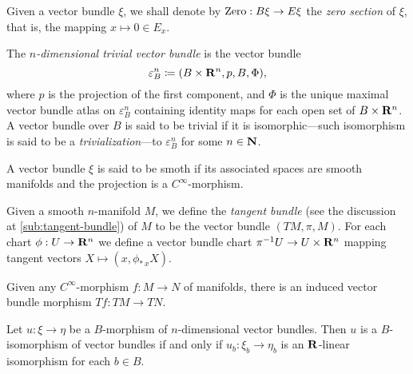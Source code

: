 \documentclass[../../../deep-dive]{subfile}
\begin{document}
\begin{definition}
\label{def:zero-section}
Given a vector bundle \(\xi\), we shall denote by \(\operatorname{Zero}: B \xi \to E \xi\)
the \emph{zero section} of \(\xi\), that is, the mapping \(x \mapsto 0 \in E_x\).
\end{definition}

\begin{definition}
\label{def:trivial-vector-bundle}
The \emph{\(n\)-dimensional trivial vector bundle} is the vector bundle
\[
\varepsilon_B^n \coloneq (B \times \mathbf{R}^n, p, B, \Phi),
\]
where \(p\) is the projection of the first component, and \(\Phi\) is the unique
maximal vector bundle atlas on \(\varepsilon_B^n\) containing identity maps for
each open set of \(B \times \mathbf{R}^n\). A vector bundle over \(B\) is said to be
trivial if it is isomorphic---such isomorphism is said to be a
\emph{trivialization}---to \(\varepsilon_B^n\) for some \(n \in \mathbf{N}\).
\end{definition}

\begin{definition}
\label{def:smooth-bundles}
A vector bundle \(\xi\) is said to be smoth if its associated spaces are smooth
manifolds and the projection is a \(C^{\infty}\)-morphism.
\end{definition}

\begin{example}
\label{exp:tangent-bundle}
Given a smooth \(n\)-manifold \(M\), we define the \emph{tangent bundle} (see
the discussion at \cref{sub:tangent-bundle}) of \(M\) to be the vector bundle
\((T M, \pi, M)\). For each chart \(\phi: U \to \mathbf{R}^n\) we define a vector bundle
chart \(\pi^{-1} U \to U \times \mathbf{R}^n\) mapping tangent vectors
\(X \mapsto (x, \phi_{*\, x} X)\).

Given any \(C^{\infty}\)-morphism \(f: M \to N\) of manifolds, there is an
induced vector bundle morphism \(T f: T M \to T N\).
\end{example}

\begin{theorem}
\label{thm:isomorphism-of-vector-bundles}
Let \(u: \xi \to \eta\) be a \(B\)-morphism of \(n\)-dimensional vector
bundles. Then \(u\) is a \(B\)-isomorphism of vector bundles if and only if
\(u_b: \xi_b \to \eta_b\) is an \(\mathbf{R}\)-linear isomorphism for each \(b \in B\).
\end{theorem}
\end{document}
